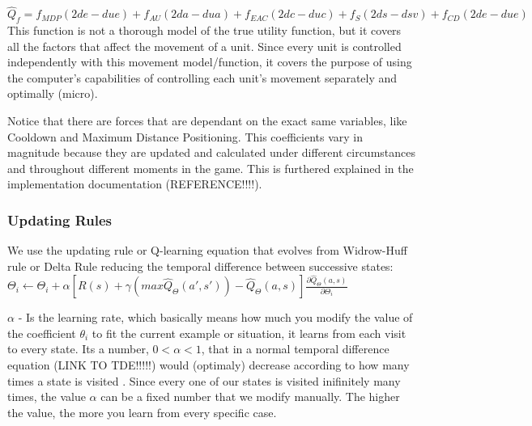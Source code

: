 $\hat{Q}_f = f_{MDP} (2de - due) + f_{AU} (2da - dua) + f_{EAC} (2dc - duc) + f_{S}  (2ds - dsv) + f_{CD} (2de - due)$ \\ 

This function is not a thorough model of the true utility function, but it covers all the factors that affect the movement of a unit. Since every unit is controlled independently with this movement model/function, it covers the purpose of using the computer's capabilities of controlling each unit's movement separately and optimally (micro).

Notice that there are forces that are dependant on the exact same variables, like Cooldown and Maximum Distance Positioning. This coefficients vary in magnitude because they are updated and calculated under different circumstances and throughout different moments in the game. This is furthered explained in the implementation documentation (REFERENCE!!!!). 

\subsubsection{Updating Rules}

We use the updating rule or Q-learning equation that evolves from Widrow-Huff rule or Delta Rule reducing the temporal difference between successive states:  \cite{rl} \\ 
 
$\Theta_i \leftarrow \Theta_i + \alpha [ R(s) + \gamma(max\hat{Q}_\Theta(a',s'))-\hat{Q}_\Theta(a,s) ] \frac{\partial \hat{Q}_\Theta(a,s)}{\partial\Theta_i}$ \\ 

\begin{flushleft}
Where $\Theta_i$ is each one of the coefficients in the Q-approximation. In the context of our  $\hat{Q}_f$ function, it would represent the forces: $f_{MDP}$, $f_{AU}$, $f_{EAC}$, $f_{S}}$, $f_{CD}$. 
\end{flushleft} 

\begin{flushleft}
$\alpha$  - Is the learning rate, which basically means how much you modify the value of the coefficient $\theta_i$ to fit the current example or situation, it learns from each visit to every state. Its a number, $0 < \alpha < 1$, that in a normal temporal difference equation (LINK TO TDE!!!!!) would (optimaly) decrease according to how many times a state is visited \cite{rl}. Since every one of our states is visited inifinitely many times, the value $\alpha$ can be a fixed number that we modify manually. The higher the value, the more you learn from every specific case.
\end{flushleft} 

